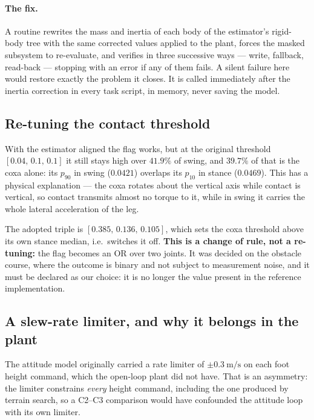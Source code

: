 \documentclass[11pt,a4paper]{article}
\newcommand{\Ct}{\textsf{C2}}
\newcommand{\Cth}{\textsf{C3}}
\begin{document}
\paragraph{The fix.} A routine rewrites the mass and inertia of each body of
the estimator's rigid-body tree with the same corrected values applied to the
plant, forces the masked subsystem to re-evaluate, and verifies in three
successive ways --- write, fallback, read-back --- stopping with an error if
any of them fails. A silent failure here would restore exactly the problem it
closes. It is called immediately after the inertia correction in every task
script, in memory, never saving the model.

\subsection{Re-tuning the contact threshold}
\label{sec:threshold}

With the estimator aligned the flag works, but at the original threshold
$[0.04,\,0.1,\,0.1]$ it still stays high over $41.9\%$ of swing, and $39.7\%$
of that is the coxa alone: its $p_{90}$ in swing ($0.0421$) overlaps its
$p_{10}$ in stance ($0.0469$). This has a physical explanation --- the coxa
rotates about the vertical axis while contact is vertical, so contact
transmits almost no torque to it, while in swing it carries the whole lateral
acceleration of the leg.

The adopted triple is $[0.385,\,0.136,\,0.105]$, which sets the coxa threshold
above its own stance median, i.e.\ switches it off. \textbf{This is a change of
rule, not a re-tuning:} the flag becomes an OR over two joints. It was decided
on the obstacle course, where the outcome is binary and not subject to
measurement noise, and it must be declared as our choice: it is no longer the
value present in the reference implementation.

\subsection{A slew-rate limiter, and why it belongs in the plant}
\label{sec:slew}

The attitude model originally carried a rate limiter of
$\pm\SI{0.3}{\meter\per\second}$ on each foot height command, which the
open-loop plant did not have. That is an asymmetry: the limiter constrains
\emph{every} height command, including the one produced by terrain search, so
a \Ct{}--\Cth{} comparison would have confounded the attitude loop with its own
limiter.
\end{document}
